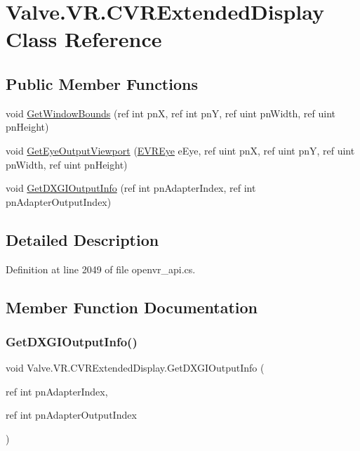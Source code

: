 \hypertarget{class_valve_1_1_v_r_1_1_c_v_r_extended_display}{}\section{Valve.\+V\+R.\+C\+V\+R\+Extended\+Display Class Reference}
\label{class_valve_1_1_v_r_1_1_c_v_r_extended_display}
\subsection*{Public Member Functions}
\begin{DoxyCompactItemize}
\item 
void \mbox{\hyperlink{class_valve_1_1_v_r_1_1_c_v_r_extended_display_a8cf81a83bf150fed4862c72e8e21b563}{Get\+Window\+Bounds}} (ref int pnX, ref int pnY, ref uint pn\+Width, ref uint pn\+Height)
\item 
void \mbox{\hyperlink{class_valve_1_1_v_r_1_1_c_v_r_extended_display_a2dee10b99a57a5ec2b86ea04f503cfbb}{Get\+Eye\+Output\+Viewport}} (\mbox{\hyperlink{namespace_valve_1_1_v_r_a8153d4a3e627e1cede046327087c1880}{E\+V\+R\+Eye}} e\+Eye, ref uint pnX, ref uint pnY, ref uint pn\+Width, ref uint pn\+Height)
\item 
void \mbox{\hyperlink{class_valve_1_1_v_r_1_1_c_v_r_extended_display_a9ce0f24c3aeb96164d4b753cd1d71456}{Get\+D\+X\+G\+I\+Output\+Info}} (ref int pn\+Adapter\+Index, ref int pn\+Adapter\+Output\+Index)
\end{DoxyCompactItemize}


\subsection{Detailed Description}


Definition at line 2049 of file openvr\+\_\+api.\+cs.



\subsection{Member Function Documentation}
\mbox{\label{class_valve_1_1_v_r_1_1_c_v_r_extended_display_a9ce0f24c3aeb96164d4b753cd1d71456}} 
\subsubsection{\texorpdfstring{GetDXGIOutputInfo()}{GetDXGIOutputInfo()}}
{\footnotesize\ttfamily void Valve.\+V\+R.\+C\+V\+R\+Extended\+Display.\+Get\+D\+X\+G\+I\+Output\+Info (\begin{DoxyParamCaption}\item[{ref int}]{pn\+Adapter\+Index,  }\item[{ref int}]{pn\+Adapter\+Output\+Index }\end{DoxyParamCaption})}



